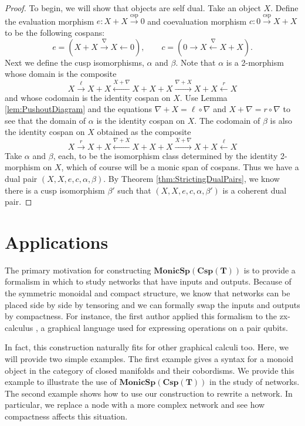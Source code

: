 \documentclass[11pt]{amsart}
\newcommand{\from}{\colon}
\newcommand{\xto}[1]{\xrightarrow{#1}}
\newcommand{\tocospan}{\xrightarrow{\mathrm{csp}}}
\newcommand{\bimonspcsp}[1]{\mathbf{MonicSp(Csp(#1))}}
\theoremstyle{remark}
\theoremstyle{definition}
\begin{document}
\begin{proof}
	To begin, we will show that objects are self dual. 
	Take an object $X$.  
	Define the evaluation morphism 
		$e \from X + X \tocospan 0$ 
	and coevaluation morphism 
		$c \from 0 \tocospan X+X$ 
	to be the following cospans:
	\[
		e = (X+X \xto{\nabla} X \gets 0), 
		\quad \quad 
		c = (0 \to X \xleftarrow{\nabla} X+X).
	\]
	Next we define the cusp isomorphisms, 
		$\alpha$ and $\beta$.
	Note that $\alpha$ is a 2-morphism 
	whose domain is the composite 
	\[
		X \xto{\ell}
		X+X \xleftarrow{X+\nabla}
		X+X+X \xto{\nabla +X}
		X+X \xleftarrow{r}
		X
	\]
	and whose codomain is the identity cospan on $X$.  
	Use Lemma \ref{lem:PushoutDiagram} 
	and the equations
		$\nabla+X = \ell \circ \nabla$ 
	and 
		$X + \nabla = r \circ \nabla$ 
	to see that the domain of $\alpha$ is 
	the identity cospan on $X$.  
	The codomain of $\beta$ is also 
	the identity cospan on $X$
	obtained as the composite 
	\[
		X \xto{r}
		X+X \xleftarrow{\nabla+X}
		X+X+X \xto{X+\nabla}
		X+X \xleftarrow{\ell}
		X
	\]
	Take $\alpha$ and $\beta$, each, 
	to be the isomorphism class determined by the identity 2-morphism on $X$, which of course will be a monic span of cospans.
	Thus we have a dual pair 
		$(X,X,e,c,\alpha,\beta)$. 
	By Theorem 
		\ref{thm:StrictingDualPairs}, 
	we know there is a cusp isomorphism $\beta'$ 
	such that 
		$(X,X,e,c,\alpha,\beta')$ 
	is a coherent dual pair.  
\end{proof}

\section{Applications} %
\label{sec:Applications}

The primary motivation for constructing $\bimonspcsp{T}$
is to provide a formalism in which to study networks
that have inputs and outputs.
Because of the symmetric monoidal and compact structure,
we know that networks can be placed side by side 
by tensoring and we can formally swap the inputs
and outputs by compactness. 
For instance, the first author applied this formalism
to the zx-calculus \cite{Cic_zx}, a graphical
language used for expressing operations
on a pair qubits.

In fact, this construction naturally 
fits for other graphical calculi too. 
Here, we will provide two simple examples.
The first example gives a syntax
for a monoid object in the category
of closed manifolds and their cobordisms.
We provide this example to illustrate 
the use of $\bimonspcsp{T}$ in the 
study of networks.
The second example shows how to use 
our construction to rewrite a network. 
In particular, we replace
a node with a more complex network
and see how compactness affects
this situation.  
\end{document}
